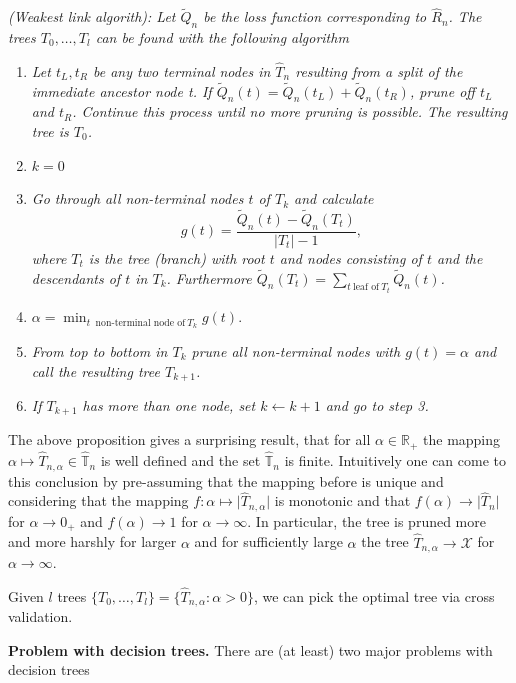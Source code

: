 \documentclass[
]{book}
\providecommand{\tightlist}{%
  \setlength{\itemsep}{0pt}\setlength{\parskip}{0pt}}
\begin{document}
\emph{(Weakest link algorith): Let \(\widetilde Q_n\) be the loss function corresponding to \(\hat R_n\). The trees \(T_0,\dots, T_l\) can be found with the following algorithm}

\begin{enumerate}
\def\labelenumi{\arabic{enumi})}
\tightlist
\item
  \emph{Let \(t_L,t_R\) be any two terminal nodes in \(\hat T_n\) resulting from a split of the immediate ancestor node t. If \(\widetilde Q_n(t) = \widetilde Q_n(t_L)+\widetilde Q_n(t_R)\), prune off \(t_L\) and \(t_R\). Continue this process until no more pruning is possible. The resulting tree is \(T_0\).}
\item
  \(k=0\)
\item
  \emph{Go through all non-terminal nodes \(t\) of \(T_k\) and calculate }
  \[g(t)=\frac{\widetilde Q_n(t)-\widetilde Q_n(T_t)}{|T_t|-1},\]
  \emph{where \(T_t\) is the tree (branch) with root \(t\) and nodes consisting of \(t\) and the descendants of \(t\) in \(T_k\). Furthermore \(\widetilde Q_n(T_t)=\sum_{t \ \text{leaf of}\  T_t} \widetilde Q_n(t)\).}
\item
  \(\alpha= \min_{t \ \text{ non-terminal node of} \ T_k}g(t)\).
\item
  \emph{From top to bottom in \(T_k\) prune all non-terminal nodes with \(g(t)=\alpha\) and call the resulting tree \(T_{k+1}\).}
\item
  \emph{If \(T_{k+1}\) has more than one node, set \(k \leftarrow k+1\) and go to step 3.}
\end{enumerate}

The above proposition gives a surprising result, that for all \(\alpha\in \mathbb R_+\) the mapping \(\alpha \mapsto\hat T_{n,\alpha}\in\hat{ \mathbb T}_n\) is well defined and the set \(\hat{ \mathbb T}_n\) is finite. Intuitively one can come to this conclusion by pre-assuming that the mapping before is unique and considering that the mapping \(f : \alpha \mapsto \vert \hat T_{n,\alpha}\vert\) is monotonic and that \(f(\alpha)\to \vert \hat T_n\vert\) for \(\alpha \to 0_+\) and \(f(\alpha)\to 1\) for \(\alpha \to \infty\). In particular, the tree is pruned more and more harshly for larger \(\alpha\) and for sufficiently large \(\alpha\) the tree \(\hat T_{n,\alpha}\to\mathcal X\) for \(\alpha \to \infty\).

Given \(l\) trees \(\{T_0,\dots, T_l\}=\{\hat T_{n,\alpha} : \alpha>0\}\), we can pick the optimal tree via cross validation.

\textbf{Problem with decision trees.} There are (at least) two major problems with decision trees
\end{document}
